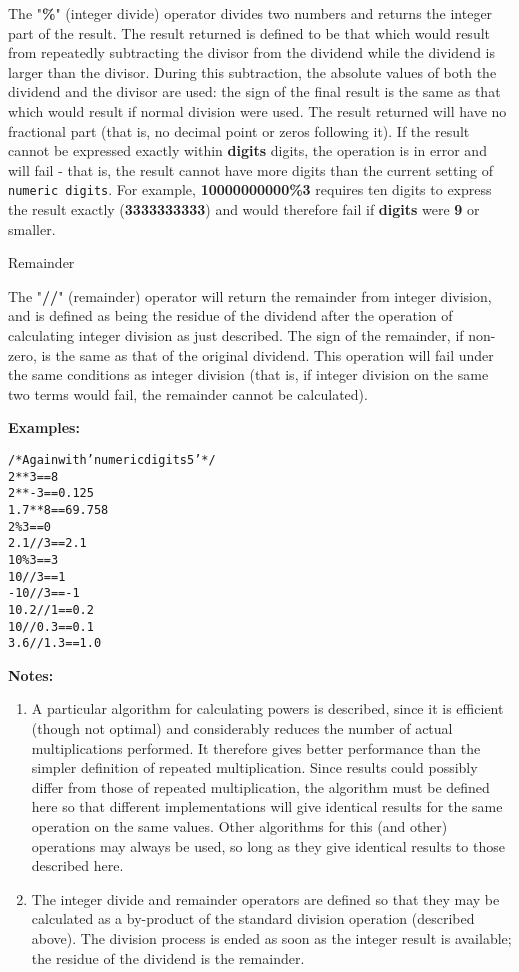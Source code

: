 \begin{description}
\index{,}
The "\textbf{\%}" (integer divide) operator divides two numbers
and returns the integer part of the result.
The result returned is defined to be that which would result from
repeatedly subtracting the divisor from the dividend while the dividend
is larger than the divisor.  During this subtraction, the absolute
values of both the dividend and the divisor are used: the sign of the
final result is the same as that which would result if normal division
were used.
 The result returned will have no fractional part (that is, no
decimal point or zeros following it).
If the result cannot be expressed exactly within \textbf{digits}
digits, the operation is in error and will fail - that is, the
result cannot have more digits than the current setting of \texttt{numeric
digits}.
For example, \textbf{10000000000\%3} requires ten digits to express the
result exactly (\textbf{3333333333}) and would therefore fail
if \textbf{digits} were \textbf{9} or smaller.
\item{Remainder}

\index{,}
\index{,}
\index{,}
The "\textbf{//}" (remainder) operator will return the remainder
from integer division, and is defined
as being the residue of the dividend after the operation of calculating
integer division as just described.
The sign of the remainder, if non-zero, is the same as that of the
original dividend.
 This operation will fail under the same conditions as integer
division (that is, if integer division on the same two terms would
fail, the remainder cannot be calculated).
\end{description}
 \textbf{Examples:}
\begin{alltt}
/* Again with 'numeric digits 5' */
2**3        ==  8
2**-3       ==  0.125
1.7**8      ==  69.758
2\%3         ==  0
2.1//3      ==  2.1
10\%3        ==  3
10//3       ==  1
-10//3      ==  -1
10.2//1     ==  0.2
10//0.3     ==  0.1
3.6//1.3    ==  1.0
\end{alltt}
 \textbf{Notes:}
\begin{enumerate}
\item A particular algorithm for calculating powers is described, since
it is efficient (though not optimal) and considerably reduces the
number of actual multiplications performed.
It therefore gives better performance than the simpler definition of
repeated multiplication.
Since results could possibly differ from those of repeated
multiplication, the algorithm must be defined here so that different
implementations will give identical results for the same operation on
the same values.
Other algorithms for this (and other) operations may always be used, so
long as they give identical results to those described here.
\item The integer divide and remainder operators are defined so that they
may be calculated as a by-product of the standard division operation
(described above).  The division process is ended as soon as the
integer result is available; the residue of the dividend is the
remainder.
\end{enumerate}
